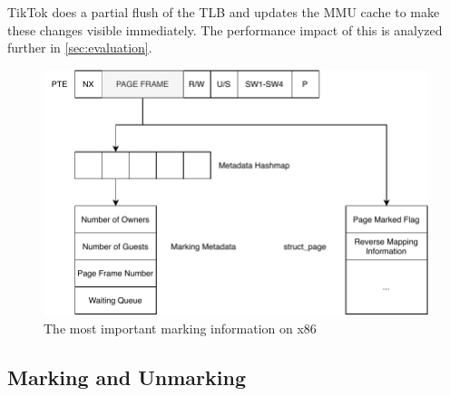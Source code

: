 \documentclass[conference]{IEEEtran}
\newcommand{\sysname}{TikTok}
\begin{document}
\sysname{} does a partial flush of the TLB and updates the MMU cache to make these
changes visible immediately. The performance impact of this is analyzed further
in \autoref{sec:evaluation}.

\begin{figure}[]
  \centering
  \includegraphics[width=\linewidth]{img/book-keeping.pdf}
  \caption{The most important marking information on x86}
  \label{fig:bookkeeping}
\end{figure}

\subsection{Marking and Unmarking}
\end{document}
